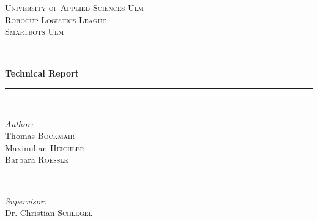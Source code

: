 \documentclass[12pt]{report}
\begin{document}
\begin{titlepage}

\newcommand{\HRule}{\rule{\linewidth}{0.5mm}} %

\center %


\textsc{\LARGE University of Applied Sciences Ulm}\\[1.5cm] %
\textsc{\Large Robocup Logistics League}\\[0.5cm] %
\textsc{\large Smartbots Ulm}\\[0.5cm] %


\HRule \\[0.4cm]
{ \huge \bfseries Technical Report}\\[0.4cm] %
\HRule \\[1.5cm]


\begin{minipage}{0.4\textwidth}
\begin{flushleft} \large
\emph{Author:}\\
Thomas \textsc{Bockmair} \\%
Maximilian \textsc{Heichler} \\%
Barbara \textsc{Roessle} \\%
\end{flushleft}
\end{minipage}
~
\begin{minipage}{0.4\textwidth}
\begin{flushright} \large
\emph{Supervisor:} \\
Dr. Christian \textsc{Schlegel} %
\end{flushright}
\end{minipage}\\[2cm]


\end{titlepage}
\end{document}
